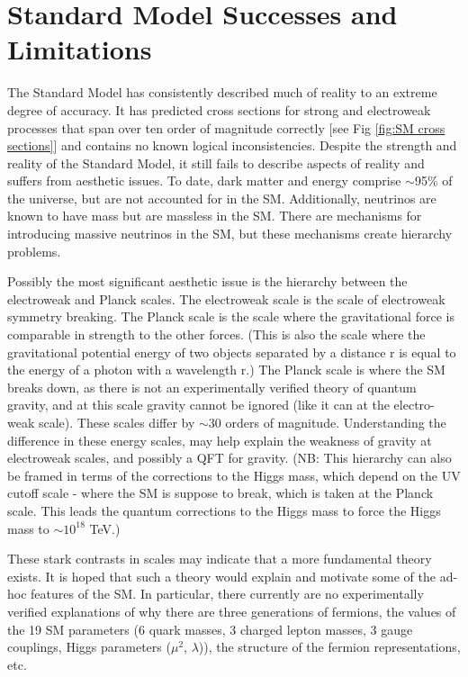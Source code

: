 \chapter{Standard Model Successes and Limitations}
The Standard Model has consistently described much of reality to an extreme degree of accuracy. It has predicted cross sections for strong and electroweak processes that span over ten order of magnitude correctly [see Fig \ref{fig:SM cross sections}] and contains no known logical inconsistencies. Despite the strength and reality of the Standard Model, it still fails to describe aspects of reality and suffers from aesthetic issues. 
To date, dark matter and energy comprise $\sim$95\% of the universe, but are not accounted for in the SM. Additionally, neutrinos are known to have mass but are massless in the SM. There are mechanisms for introducing massive neutrinos in the SM, but these mechanisms create hierarchy problems. 

Possibly the most significant aesthetic issue is the hierarchy between the electroweak and Planck scales. The electroweak scale is the scale of electroweak symmetry breaking. The Planck scale is the scale where the gravitational force is comparable in strength to the other forces. (This is also the scale where the gravitational potential energy of two objects separated by a distance r is equal to the energy of a photon with a wavelength r.) The Planck scale is where the SM breaks down, as there is not an experimentally verified theory of quantum gravity, and at this scale gravity cannot be ignored (like it can at the electro-weak scale). These scales differ by $\sim30$ orders of magnitude. Understanding the difference in these energy scales, may help explain the weakness of gravity at electroweak scales, and possibly a QFT for gravity. (NB: This hierarchy can also be framed in terms of the corrections to the Higgs mass, which depend on the UV cutoff scale - where the SM is suppose to break, which is taken at the Planck scale. This leads the quantum corrections to the Higgs mass to force the Higgs mass to $\sim 10^{18}$ TeV.)

These stark contrasts in scales may indicate that a more fundamental theory exists. It is hoped that such a theory would explain and motivate some of the ad-hoc features of the SM. In particular, there currently are no experimentally verified explanations of why there are three generations of fermions, the values of the 19 SM parameters (6 quark masses, 3 charged lepton masses, 3 gauge couplings, Higgs parameters ($\mu^{2}$, $\lambda$)), the structure of the fermion representations, etc. 



